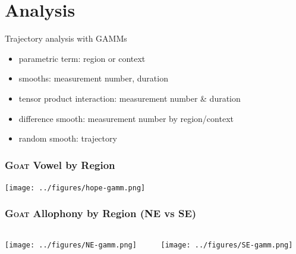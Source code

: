 \documentclass[
xcolor=table,
PHONON=true]
{beamer}
\newcommand{\scs}{\textsc}
\begin{document}
\section{Analysis}
	\begin{frame}
		Trajectory analysis with GAMMs \citep{itsadug,mgcv,Soskuthy2019}
			\pause
			\begin{itemize}
				\item parametric term: region or context
				\item smooths: measurement number, duration
				\item tensor product interaction: measurement number \& duration
				\item difference smooth: measurement number by region/context
				\item random smooth: trajectory
			\end{itemize}
	\end{frame}
	\begin{frame}
		\frametitle{\scs{Goat} Vowel by Region}
		\texttt{[image: ../figures/hope-gamm.png]}
	\end{frame}
	\begin{frame}
		\frametitle{\scs{Goat} Allophony by Region (NE vs SE)}
				\begin{columns}
					\begin{column}{0.5\textwidth}
						\texttt{[image: ../figures/NE-gamm.png]}
					\end{column}
					\begin{column}{0.5\textwidth}
						\texttt{[image: ../figures/SE-gamm.png]}
					\end{column}
				\end{columns}
	\end{frame}
\end{document}
